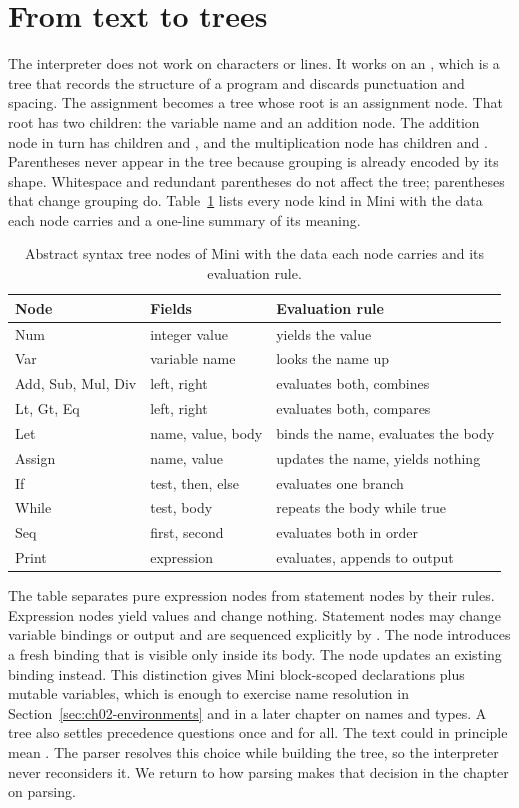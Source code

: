 \section{From text to trees}
\label{sec:ch02-text-to-trees}

The interpreter does not work on characters or lines.
It works on an , which is a tree that records the structure of a program and discards punctuation and spacing.
The assignment  becomes a tree whose root is an assignment node.
That root has two children: the variable name  and an addition node.
The addition node in turn has children  and , and the multiplication node has children  and .
Parentheses never appear in the tree because grouping is already encoded by its shape.
Whitespace and redundant parentheses do not affect the tree; parentheses that change grouping do.
Table~\ref{tab:ch02-ast-nodes} lists every node kind in Mini with the data each node carries and a one-line summary of its meaning.
\begin{table}
\caption{Abstract syntax tree nodes of Mini with the data each node carries and its evaluation rule.}
\label{tab:ch02-ast-nodes}
\centering
\begin{tabular}{lll}
\toprule
Node & Fields & Evaluation rule \\
\midrule
Num & integer value & yields the value \\
Var & variable name & looks the name up \\
Add, Sub, Mul, Div & left, right & evaluates both, combines \\
Lt, Gt, Eq & left, right & evaluates both, compares \\
Let & name, value, body & binds the name, evaluates the body \\
Assign & name, value & updates the name, yields nothing \\
If & test, then, else & evaluates one branch \\
While & test, body & repeats the body while true \\
Seq & first, second & evaluates both in order \\
Print & expression & evaluates, appends to output \\
\bottomrule
\end{tabular}
\end{table}
The table separates pure expression nodes from statement nodes by their rules.
Expression nodes yield values and change nothing.
Statement nodes may change variable bindings or output and are sequenced explicitly by .
The  node introduces a fresh binding that is visible only inside its body.
The  node updates an existing binding instead.
This distinction gives Mini block-scoped declarations plus mutable variables, which is enough to exercise name resolution in Section~\ref{sec:ch02-environments} and in a later chapter on names and types.
A tree also settles precedence questions once and for all.
The text  could in principle mean .
The parser resolves this choice while building the tree, so the interpreter never reconsiders it.
We return to how parsing makes that decision in the chapter on parsing.

